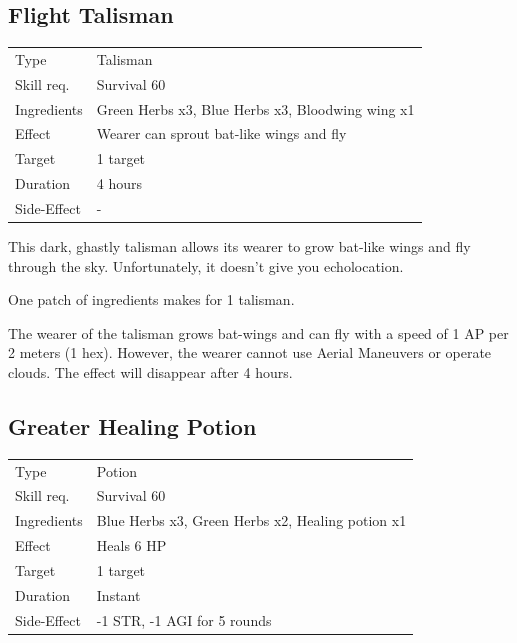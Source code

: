\documentclass[11pt,a4paper,twocolumn]{book}
\begin{document}
\subsection*{Flight Talisman}
{
	\begin{tabu} to 75mm{| X[l,4] | X[l,8] |}
		\hline
		Type 			& Talisman 													\\
        Skill req.	    & Survival 60 												\\
        Ingredients     & Green Herbs x3, Blue Herbs x3, Bloodwing wing x1			\\
        Effect     		& Wearer can sprout bat-like wings and fly 					\\
        Target      	& 1 target													\\
        Duration  		& 4 hours	 												\\
        Side-Effect     & -															\\ \hline
	\end{tabu}
		
}

\medskip

This dark, ghastly talisman allows its wearer to grow bat-like wings and fly through the sky. Unfortunately, it doesn't give you echolocation.

One patch of ingredients makes for 1 talisman.

The wearer of the talisman grows bat-wings and can fly with a speed of 1 AP per 2 meters (1 hex). However, the wearer cannot use Aerial Maneuvers or operate clouds. The effect will disappear after 4 hours.

\vfill


\subsection*{Greater Healing Potion}
{
	\begin{tabu} to 75mm{| X[l,4] | X[l,8] |}
		\hline
		Type 			& Potion 													\\
        Skill req.	    & Survival 60 												\\
        Ingredients     & Blue Herbs x3, Green Herbs x2, Healing potion x1			\\
        Effect     		& Heals 6 HP 												\\
        Target      	& 1 target													\\
        Duration  		& Instant	 												\\
        Side-Effect     & -1 STR, -1 AGI for 5 rounds								\\ \hline
	\end{tabu}	
}
\end{document}
